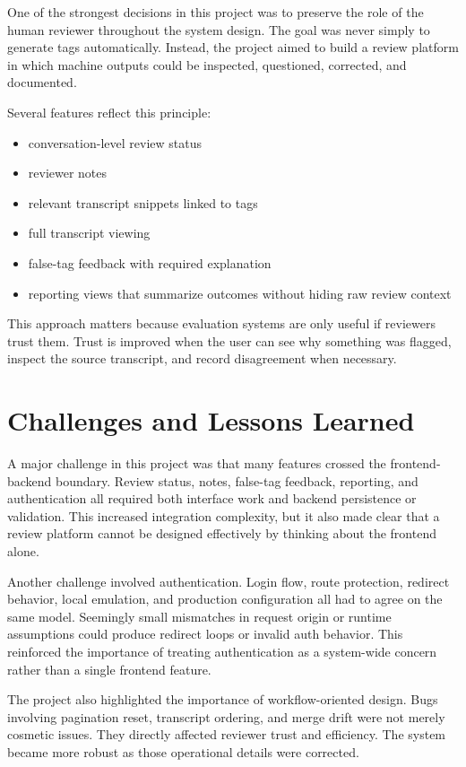 \documentclass[12pt]{article}
\begin{document}
	One of the strongest decisions in this project was to preserve the role of the human reviewer throughout the system design. The goal was never simply to generate tags automatically. Instead, the project aimed to build a review platform in which machine outputs could be inspected, questioned, corrected, and documented.
	
	Several features reflect this principle:
	\begin{itemize}
		\item conversation-level review status
		\item reviewer notes
		\item relevant transcript snippets linked to tags
		\item full transcript viewing
		\item false-tag feedback with required explanation
		\item reporting views that summarize outcomes without hiding raw review context
	\end{itemize}
	
	This approach matters because evaluation systems are only useful if reviewers trust them. Trust is improved when the user can see why something was flagged, inspect the source transcript, and record disagreement when necessary.
	
	\section{Challenges and Lessons Learned}
	
	A major challenge in this project was that many features crossed the frontend-backend boundary. Review status, notes, false-tag feedback, reporting, and authentication all required both interface work and backend persistence or validation. This increased integration complexity, but it also made clear that a review platform cannot be designed effectively by thinking about the frontend alone.
	
	Another challenge involved authentication. Login flow, route protection, redirect behavior, local emulation, and production configuration all had to agree on the same model. Seemingly small mismatches in request origin or runtime assumptions could produce redirect loops or invalid auth behavior. This reinforced the importance of treating authentication as a system-wide concern rather than a single frontend feature.
	
	The project also highlighted the importance of workflow-oriented design. Bugs involving pagination reset, transcript ordering, and merge drift were not merely cosmetic issues. They directly affected reviewer trust and efficiency. The system became more robust as those operational details were corrected.
	
\end{document}
